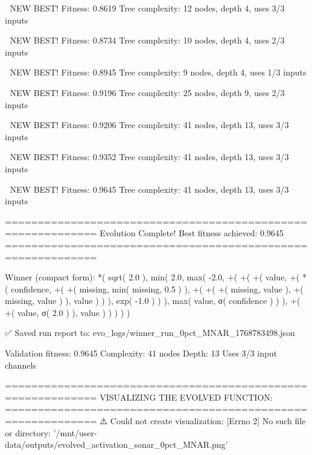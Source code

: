 🎯 NEW BEST! Fitness: 0.8619
Tree complexity: 12 nodes, depth 4, uses 3/3 inputs

🎯 NEW BEST! Fitness: 0.8734
Tree complexity: 10 nodes, depth 4, uses 2/3 inputs

🎯 NEW BEST! Fitness: 0.8945
Tree complexity: 9 nodes, depth 4, uses 1/3 inputs

🎯 NEW BEST! Fitness: 0.9196
Tree complexity: 25 nodes, depth 9, uses 2/3 inputs

🎯 NEW BEST! Fitness: 0.9206
Tree complexity: 41 nodes, depth 13, uses 3/3 inputs

🎯 NEW BEST! Fitness: 0.9352
Tree complexity: 41 nodes, depth 13, uses 3/3 inputs

🎯 NEW BEST! Fitness: 0.9645
Tree complexity: 41 nodes, depth 13, uses 3/3 inputs

============================================================
Evolution Complete!
Best fitness achieved: 0.9645
============================================================

Winner (compact form):
 *(
  sqrt(
    2.0
  ),
  min(
    2.0,
    max(
      -2.0,
      +(
        +(
          +(
            value,
            +(
              *(
                confidence,
                +(
                  +(
                    missing,
                    min(
                      missing,
                      0.5
                    )
                  ),
                  +(
                    +(
                      +(
                        missing,
                        value
                      ),
                      +(
                        missing,
                        value
                      )
                    ),
                    value
                  )
                )
              ),
              exp(
                -1.0
              )
            )
          ),
          max(
            value,
            σ(
              confidence
            )
          )
        ),
        +(
          +(
            value,
            σ(
              2.0
            )
          ),
          value
        )
      )
    )
  )
)

✅ Saved run report to: evo_logs/winner_run_0pct_MNAR_1768783498.json

Validation fitness: 0.9645
Complexity: 41 nodes
Depth: 13
Uses 3/3 input channels

============================================================
VISUALIZING THE EVOLVED FUNCTION:
============================================================
⚠️ Could not create visualization: [Errno 2] No such file or directory: '/mnt/user-data/outputs/evolved_activation_sonar_0pct_MNAR.png'


